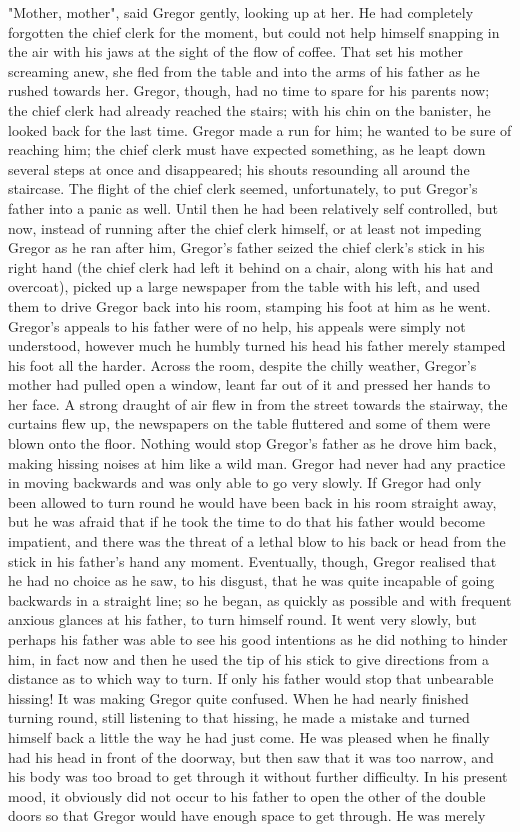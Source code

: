 \documentclass[12pt]{book}
\begin{document}
    "Mother, mother", said Gregor gently, looking up at her. He had completely forgotten the chief clerk for the moment, but could not help himself snapping in the air with his jaws at the sight of the flow of coffee. That set his mother screaming anew, she fled from the table and into the arms of his father as he rushed towards her. Gregor, though, had no time to spare for his parents now; the chief clerk had already reached the stairs; with his chin on the banister, he looked back for the last time. Gregor made a run for him; he wanted to be sure of reaching him; the chief clerk must have expected something, as he leapt down several steps at once and disappeared; his shouts resounding all around the staircase. The flight of the chief clerk seemed, unfortunately, to put Gregor's father into a panic as well. Until then he had been relatively self controlled, but now, instead of running after the chief clerk himself, or at least not impeding Gregor as he ran after him, Gregor's father seized the chief clerk's stick in his right hand (the chief clerk had left it behind on a chair, along with his hat and overcoat), picked up a large newspaper from the table with his left, and used them to drive Gregor back into his room, stamping his foot at him as he went. Gregor's appeals to his father were of no help, his appeals were simply not understood, however much he humbly turned his head his father merely stamped his foot all the harder. Across the room, despite the chilly weather, Gregor's mother had pulled open a window, leant far out of it and pressed her hands to her face. A strong draught of air flew in from the street towards the stairway, the curtains flew up, the newspapers on the table fluttered and some of them were blown onto the floor. Nothing would stop Gregor's father as he drove him back, making hissing noises at him like a wild man. Gregor had never had any practice in moving backwards and was only able to go very slowly. If Gregor had only been allowed to turn round he would have been back in his room straight away, but he was afraid that if he took the time to do that his father would become impatient, and there was the threat of a lethal blow to his back or head from the stick in his father's hand any moment. Eventually, though, Gregor realised that he had no choice as he saw, to his disgust, that he was quite incapable of going backwards in a straight line; so he began, as quickly as possible and with frequent anxious glances at his father, to turn himself round. It went very slowly, but perhaps his father was able to see his good intentions as he did nothing to hinder him, in fact now and then he used the tip of his stick to give directions from a distance as to which way to turn. If only his father would stop that unbearable hissing! It was making Gregor quite confused. When he had nearly finished turning round, still listening to that hissing, he made a mistake and turned himself back a little the way he had just come. He was pleased when he finally had his head in front of the doorway, but then saw that it was too narrow, and his body was too broad to get through it without further difficulty. In his present mood, it obviously did not occur to his father to open the other of the double doors so that Gregor would have enough space to get through. He was merely 
\end{document}
